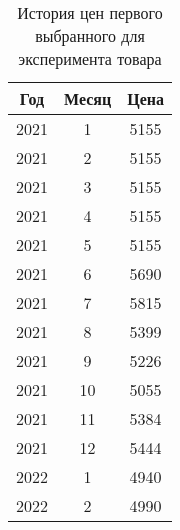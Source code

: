 \documentclass{bmstu}
\begin{document}
\begin{table}[H]
	\caption{История цен первого выбранного для эксперимента товара}
	\begin{center}
		\begin{tabular}{| c | c | c |} 
			\hline
			
			\textbf{Год} & \textbf{Месяц} & \textbf{Цена} \\  
			
			\hline
			
			2021 & 1 & 5155 \\
			
			\hline
			
			2021 & 2 & 5155 \\
			
			\hline
			
			2021 & 3 & 5155 \\
			
			\hline
			
			2021 & 4 & 5155 \\
			
			\hline
			
			2021 & 5 & 5155 \\
			
			\hline
			
			2021 & 6 & 5690 \\
			
			\hline
			
			2021 & 7 & 5815 \\
			
			\hline
			
			2021 & 8 & 5399 \\
			
			\hline
			
			2021 & 9 & 5226 \\
			
			\hline
			
			2021 & 10 & 5055 \\
			
			\hline
			
			2021 & 11 & 5384 \\
			
			\hline
			
			2021 & 12 & 5444 \\
			
			\hline
			
			2022 & 1 & 4940 \\
			
			\hline
			
			2022 & 2 & 4990 \\
			

\end{tabular}
\end{center}
\end{table}
\end{document}
